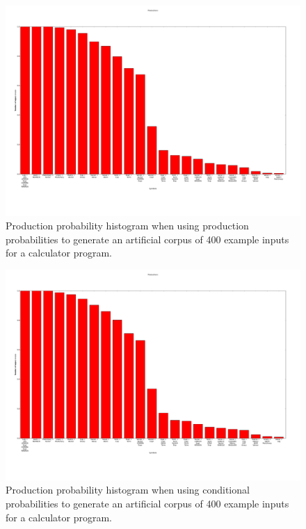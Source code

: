 \begin{figure}
    \begin{center}

\includegraphics[scale=0.23]{figs/gen/pp/production_probability_histogram.png}
    \end{center}
        \caption{Production probability histogram when using production
probabilities
to generate an artificial corpus of 400 example inputs for a calculator
program.}
    \label{times}
\end{figure}

\begin{figure}
    \begin{center}

\includegraphics[scale=0.23]{figs/gen/production_probability_histogram.png}
    \end{center}
        \caption{Production probability histogram when using conditional
probabilities to generate an artificial corpus of 400 example inputs for a
calculator program.}
    \label{times}
\end{figure}


